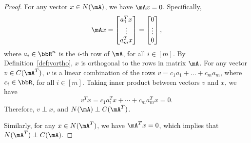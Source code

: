 \documentclass[11pt]{article}
\theoremstyle{plain}
\theoremstyle{definition}
\begin{document}
\begin{proof}
	For any vector $x \in N(\mA)$, we have $\mA x = 0$. Specifically,
	\begin{align}
		\mA x  = \begin{bmatrix}
			a_1^T x \\ \vdots \\ a_m^T x 
		\end{bmatrix} = \begin{bmatrix}
			0\\ \vdots \\0
		\end{bmatrix},
	\end{align}
	where $a_i \in \bbR^n$ is the $i$-th  row of $\mA$, for all $ i \in [m]$. By Definition~\ref{def:vortho}, $x$ is orthogonal to the rows in matrix $\mA$. For any vector $v \in C(\mA^T)$, $v$ is a linear combination of the rows $v = c_1 a_1 + ...+c_m a_m$, where $c_i \in \bbR$, for all $i\in [m]$. Taking inner product between vectors $v$ and $x$, we have
	\[  v^T x =  c_1 a_1^T x + \cdots + c_m a_m^T x = 0.  \]
	Therefore, $v \perp x$, and $N(\mA) \perp C(\mA^T)$.
	
	Similarly, for any $x \in N(\mA^T)$, we have $\mA^T x = 0$, which implies  that $N(\mA^T) \perp C(\mA)$. 
\end{proof}
\end{document}

